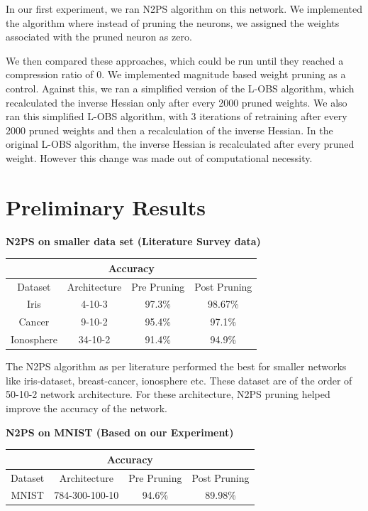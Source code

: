 \documentclass{article}
\begin{document}
In our first experiment, we ran N2PS algorithm on this network. We implemented the algorithm where instead of pruning the neurons, we assigned the weights associated with the pruned neuron as zero.

We then compared these approaches, which could be run until they reached a compression ratio of 0. We implemented magnitude based weight pruning as a control. Against this, we ran a simplified version of the L-OBS algorithm, which recalculated the inverse Hessian only after every 2000 pruned weights. We also ran this simplified L-OBS algorithm, with 3 iterations of retraining after every 2000 pruned weights and then a recalculation of the inverse Hessian. In the original L-OBS algorithm, the inverse Hessian is recalculated after every pruned weight. However this change was made out of computational necessity.

\section{Preliminary Results}
\label{Preliminary Results}

\begin{center}
\textbf{N2PS on smaller data set (Literature Survey data)}
\begin{tabular}{|c|c|c|c|} 
\hline
\multicolumn{4}{|c|}{Accuracy} \\
\hline
Dataset&Architecture&Pre Pruning&Post Pruning\\
\hline
Iris & 4-10-3 & 97.3\% & 98.67\%  \\ 
Cancer & 9-10-2 & 95.4\% & 97.1\%  \\ 
Ionosphere & 34-10-2 &91.4\% & 94.9\% \\
\hline
\end{tabular}
\end{center}
\vspace*{-0.28cm}
The N2PS algorithm as per literature performed the best for smaller networks like iris-dataset, breast-cancer, ionosphere etc. These dataset are of the order of 50-10-2 network architecture. For these architecture, N2PS pruning helped improve the accuracy of the network.
\begin{center}
\textbf{N2PS on MNIST (Based on our Experiment)}

 \begin{tabular}{|c|c|c|c|}
 \hline
 \multicolumn{4}{|c|}{Accuracy} \\
 \hline
Dataset & Architecture & Pre Pruning & Post Pruning  \\
 \hline
MNIST  & 784-300-100-10 & 94.6\% & 89.98\%  \\ 
 \hline
 \end{tabular}
\end{center}
\end{document}
